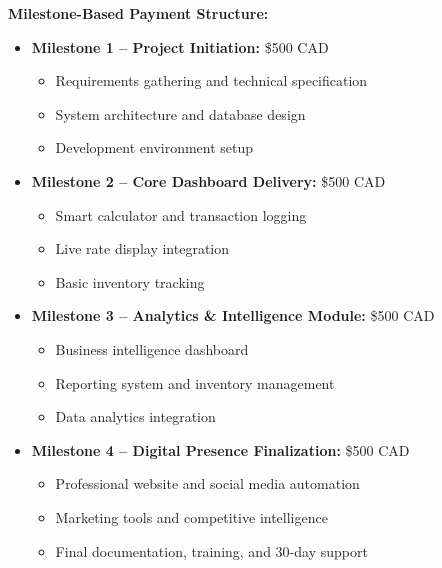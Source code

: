 \documentclass[11pt, letterpaper]{article}
\begin{document}
\begin{tcolorbox}[colback=techBlue!10, colframe=techBlue, title=\textbf{Project Investment: \$2,000 CAD}]

\textbf{Milestone-Based Payment Structure:}
\begin{itemize}[leftmargin=*]
    \item \textbf{Milestone 1 – Project Initiation:} \$500 CAD
        \begin{itemize}
            \item Requirements gathering and technical specification
            \item System architecture and database design
            \item Development environment setup
        \end{itemize}

    \item \textbf{Milestone 2 – Core Dashboard Delivery:} \$500 CAD
        \begin{itemize}
            \item Smart calculator and transaction logging
            \item Live rate display integration
            \item Basic inventory tracking
        \end{itemize}

    \item \textbf{Milestone 3 – Analytics \& Intelligence Module:} \$500 CAD
        \begin{itemize}
            \item Business intelligence dashboard
            \item Reporting system and inventory management
            \item Data analytics integration
        \end{itemize}

    \item \textbf{Milestone 4 – Digital Presence Finalization:} \$500 CAD
        \begin{itemize}
            \item Professional website and social media automation
            \item Marketing tools and competitive intelligence
            \item Final documentation, training, and 30-day support
        \end{itemize}
\end{itemize}


\end{tcolorbox}
\end{document}
